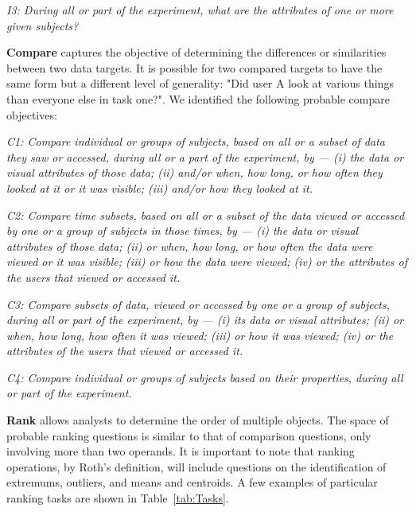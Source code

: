 \vspace{2mm}
\hangindent=3mm\textit{I3: During all or part of the experiment, what are the attributes of one or more given subjects?} 


\vspace{2mm}
\noindent\textbf{Compare} captures the objective of determining the differences or similarities between two data targets. It is possible for two compared targets to have the same form but a different level of generality: "Did user A look at various things than everyone else in task one?". We identified the following probable compare objectives: 

\vspace{2mm}
\hangindent=3mm\textit{C1: Compare individual or groups of subjects, based on all or a subset of data they saw or accessed, during all or a part of the experiment, by --- (i) the data or visual attributes of those data; (ii) and/or when, how long, or how often they looked at it or it was visible; (iii) and/or how they looked at it.}

\vspace{2mm}
\hangindent=3mm\textit{C2: Compare time subsets, based  on all or a subset of the data viewed or accessed by one or a group of subjects in those times, by --- (i) the data or visual attributes of those data; (ii) or when, how long, or how often the data were viewed or it was visible; (iii) or how the data were viewed; (iv) or the attributes of the users that viewed or accessed it.}

\vspace{2mm}
\hangindent=3mm\textit{C3: Compare subsets of data, viewed or accessed by one or a group of subjects, during all or part of the experiment, by --- (i) its data or visual attributes; (ii) or when, how long, how often it was viewed; (iii) or how it was viewed; (iv) or the attributes of the users that viewed or accessed it.}
	
\vspace{2mm}
\hangindent=3mm\textit{C4: Compare individual or groups of subjects based on their properties, during all or part of the experiment.}

\vspace{2mm}
\noindent\textbf{Rank} allows analysts to determine the order of multiple objects. The space of probable ranking questions is similar to that of comparison questions, only involving more than two operands. It is important to note that ranking operations, by Roth's definition, will include questions on the identification of extremums, outliers, and means and centroids. A few examples of particular ranking tasks are shown in Table~\ref{tab:Tasks}. 


